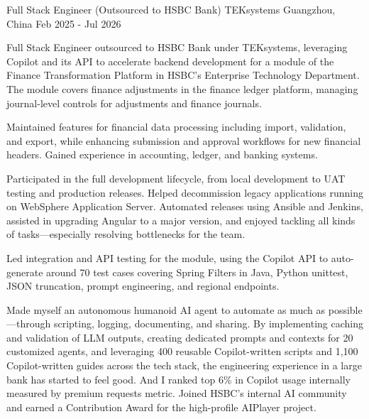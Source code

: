 
\begin{cventries}

  \cventry
    {Full Stack Engineer (Outsourced to HSBC Bank)} %
    {TEKsystems} %
    {Guangzhou, China} %
    {Feb 2025 - Jul 2026} %
    {
      \begin{cvitems} %
        \item {Full Stack Engineer outsourced to HSBC Bank under TEKsystems, leveraging Copilot and its API to accelerate backend development for a module of the Finance Transformation Platform in HSBC's Enterprise Technology Department. The module covers finance adjustments in the finance ledger platform, managing journal-level controls for adjustments and finance journals.}
        \item {Maintained features for financial data processing including import, validation, and export, while enhancing submission and approval workflows for new financial headers. Gained experience in accounting, ledger, and banking systems.}
        \item {Participated in the full development lifecycle, from local development to UAT testing and production releases. Helped decommission legacy applications running on WebSphere Application Server. Automated releases using Ansible and Jenkins, assisted in upgrading Angular to a major version, and enjoyed tackling all kinds of tasks—especially resolving bottlenecks for the team.}
        \item {Led integration and API testing for the module, using the Copilot API to auto-generate around 70 test cases covering Spring Filters in Java, Python unittest, JSON truncation, prompt engineering, and regional endpoints.}
        \item {Made myself an autonomous humanoid AI agent to automate as much as possible—through scripting, logging, documenting, and sharing. By implementing caching and validation of LLM outputs, creating dedicated prompts and contexts for 20 customized agents, and leveraging 400 reusable Copilot-written scripts and 1,100 Copilot-written guides across the tech stack, the engineering experience in a large bank has started to feel good. And I ranked top 6\% in Copilot usage internally measured by premium requests metric. Joined HSBC's internal AI community and earned a Contribution Award for the high-profile AIPlayer project.}

\end{cvitems}}
\end{cventries}
